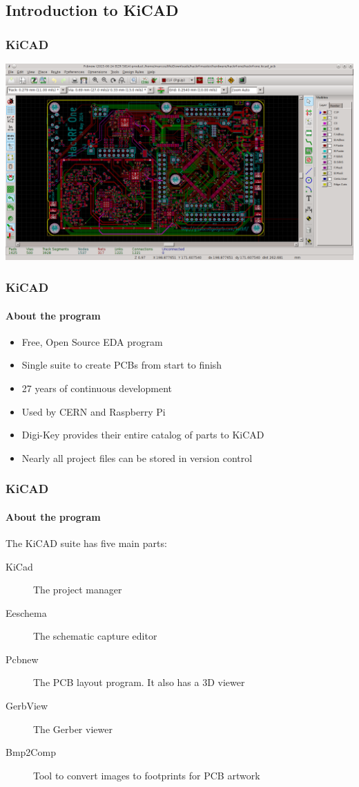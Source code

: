 \documentclass[]{beamer}
\begin{document}
\subsection[KiCAD]{Introduction to KiCAD}
\begin{frame}
    \frametitle{KiCAD}
    \includegraphics[width=0.85\paperwidth,keepaspectratio]{images/KiCad_Pcbnew_OpenGL.png}
\end{frame}

\begin{frame}
    \frametitle{KiCAD}
    \framesubtitle{About the program}
    \begin{itemize}
        \item{Free, Open Source EDA program}
        \item{Single suite to create PCBs from start to finish}
        \item{27 years of continuous development}
        \item{Used by CERN and Raspberry Pi}
        \item{Digi-Key provides their entire catalog of parts to KiCAD}
        \item{Nearly all project files can be stored in version control}
    \end{itemize}
\end{frame}

\begin{frame}
    \frametitle{KiCAD}
    \framesubtitle{About the program}
    The KiCAD suite has five main parts:
    \begin{description}
        \item[KiCad]{The project manager}
        \item[Eeschema]{The schematic capture editor}
        \item[Pcbnew]{The PCB layout program. It also has a 3D viewer}
        \item[GerbView]{The Gerber viewer}
        \item[Bmp2Comp]{Tool to convert images to footprints for PCB artwork}
    \end{description}
\end{frame}
\end{document}
